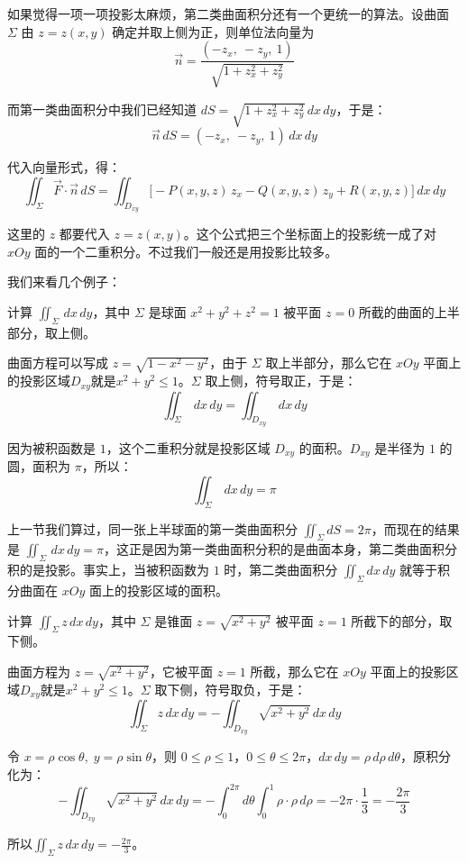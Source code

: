 如果觉得一项一项投影太麻烦，第二类曲面积分还有一个更统一的算法。设曲面 \(\Sigma\) 由 \(z = z(x,y)\) 确定并取上侧为正，则单位法向量为
\[
\vec{n} = \frac{(-z_x,\ -z_y,\ 1)}{\sqrt{1+z_x^2+z_y^2}}
\]

而第一类曲面积分中我们已经知道 \(dS = \sqrt{1+z_x^2+z_y^2}\,dx\,dy\)，于是：
\[
\vec{n}\,dS = (-z_x,\ -z_y,\ 1)\,dx\,dy
\]

代入向量形式，得：
\[
\iint_{\Sigma} \vec{F} \cdot \vec{n}\,dS = \iint_{D_{xy}} \bigl[ -P(x,y,z)\,z_x - Q(x,y,z)\,z_y + R(x,y,z) \bigr]\,dx\,dy
\]

这里的 \(z\) 都要代入 \(z = z(x,y)\)。这个公式把三个坐标面上的投影统一成了对 \(xOy\) 面的一个二重积分。不过我们一般还是用投影比较多。

我们来看几个例子：

\begin{myexample}
计算 \(\iint_{\Sigma} \,dx\,dy\)，其中 \(\Sigma\) 是球面 \(x^2+y^2+z^2=1\) 被平面 \(z=0\) 所截的曲面的上半部分，取上侧。

曲面方程可以写成 \(z=\sqrt{1-x^2-y^2}\)，由于 \(\Sigma\) 取上半部分，那么它在 \(xOy\) 平面上的投影区域\(D_{xy}\)就是\(x^2+y^2\le 1\)。\(\Sigma\) 取上侧，符号取正，于是：
\[
\iint_{\Sigma} \,dx\,dy = \iint_{D_{xy}} \,dx\,dy
\]

因为被积函数是 \(1\)，这个二重积分就是投影区域 \(D_{xy}\) 的面积。\(D_{xy}\) 是半径为 \(1\) 的圆，面积为 \(\pi\)，所以：
\[
\iint_{\Sigma} \,dx\,dy = \pi
\]
\end{myexample}

上一节我们算过，同一张上半球面的第一类曲面积分 \(\iint_{\Sigma} dS = 2\pi\)，而现在的结果是 \(\iint_{\Sigma} \,dx\,dy = \pi\)，这正是因为第一类曲面积分积的是曲面本身，第二类曲面积分积的是投影。事实上，当被积函数为 \(1\) 时，第二类曲面积分 \(\iint_{\Sigma} dx\,dy\) 就等于积分曲面在 \(xOy\) 面上的投影区域的面积。

\begin{myexample}
计算 \(\iint_{\Sigma} z\,dx\,dy\)，其中 \(\Sigma\) 是锥面 \(z=\sqrt{x^2+y^2}\) 被平面 \(z=1\) 所截下的部分，取下侧。

曲面方程为 \(z=\sqrt{x^2+y^2}\)，它被平面 \(z=1\) 所截，那么它在 \(xOy\) 平面上的投影区域\(D_{xy}\)就是\(x^2+y^2\le 1\)。\(\Sigma\) 取下侧，符号取负，于是：
\[
\iint_{\Sigma} z\,dx\,dy = -\iint_{D_{xy}} \sqrt{x^2+y^2}\,dx\,dy
\]

令 \(x=\rho\cos\theta,\; y=\rho\sin\theta\)，则 \(0\le \rho\le 1\)，\(0\le\theta\le2\pi\)，\(dx\,dy = \rho\,d\rho\,d\theta\)，原积分化为：
\[
-\iint_{D_{xy}} \sqrt{x^2+y^2}\,dx\,dy = -\int_0^{2\pi} d\theta \int_0^1 \rho\cdot \rho\,d\rho
= -2\pi\cdot\frac13 = -\frac{2\pi}{3}
\]

所以\(\iint_{\Sigma} z\,dx\,dy = -\frac{2\pi}{3}\)。
\end{myexample}

